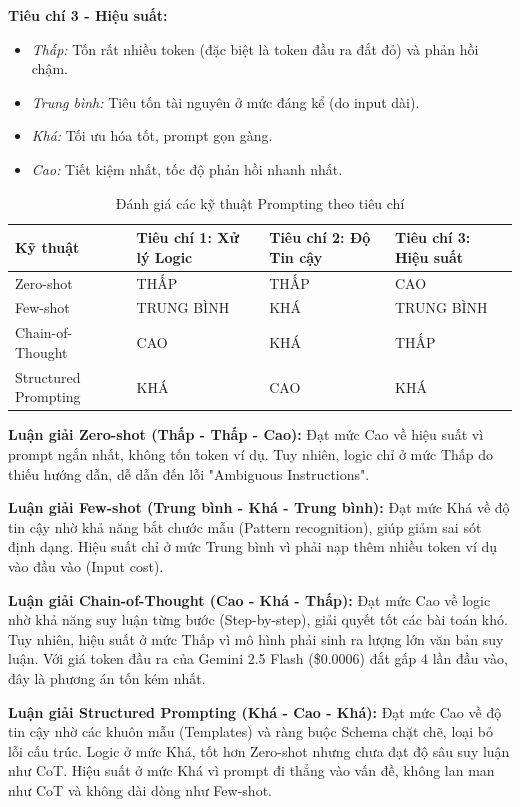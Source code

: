 \textbf{Tiêu chí 3 - Hiệu suất:}
\begin{itemize}
    \item \textit{Thấp:} Tốn rất nhiều token (đặc biệt là token đầu ra đắt đỏ) và phản hồi chậm.
    \item \textit{Trung bình:} Tiêu tốn tài nguyên ở mức đáng kể (do input dài).
    \item \textit{Khá:} Tối ưu hóa tốt, prompt gọn gàng.
    \item \textit{Cao:} Tiết kiệm nhất, tốc độ phản hồi nhanh nhất.
\end{itemize}

{\small
\begin{table}[htp]
\centering
\caption{Đánh giá các kỹ thuật Prompting theo tiêu chí}\label{tab:prompting-evaluation}
\begin{tabular}{|p{4cm}|p{3.2cm}|p{3.2cm}|p{3.2cm}|}
\hline
\textbf{Kỹ thuật} & \textbf{Tiêu chí 1: Xử lý Logic} & \textbf{Tiêu chí 2: Độ Tin cậy} & \textbf{Tiêu chí 3: Hiệu suất} \\ \hline
Zero-shot & THẤP & THẤP & CAO \\ \hline
Few-shot & TRUNG BÌNH & KHÁ & TRUNG BÌNH \\ \hline
Chain-of-Thought & CAO & KHÁ & THẤP \\ \hline
Structured Prompting & KHÁ & CAO & KHÁ \\ \hline
\end{tabular}
\end{table}
}

\textbf{Luận giải Zero-shot (Thấp - Thấp - Cao):} Đạt mức Cao về hiệu suất vì prompt ngắn nhất, không tốn token ví dụ. Tuy nhiên, logic chỉ ở mức Thấp do thiếu hướng dẫn, dễ dẫn đến lỗi "Ambiguous Instructions".

\textbf{Luận giải Few-shot (Trung bình - Khá - Trung bình):} Đạt mức Khá về độ tin cậy nhờ khả năng bắt chước mẫu (Pattern recognition), giúp giảm sai sót định dạng. Hiệu suất chỉ ở mức Trung bình vì phải nạp thêm nhiều token ví dụ vào đầu vào (Input cost).

\textbf{Luận giải Chain-of-Thought (Cao - Khá - Thấp):} Đạt mức Cao về logic nhờ khả năng suy luận từng bước (Step-by-step), giải quyết tốt các bài toán khó. Tuy nhiên, hiệu suất ở mức Thấp vì mô hình phải sinh ra lượng lớn văn bản suy luận. Với giá token đầu ra của Gemini 2.5 Flash (\$0.0006) đắt gấp 4 lần đầu vào, đây là phương án tốn kém nhất.

\textbf{Luận giải Structured Prompting (Khá - Cao - Khá):} Đạt mức Cao về độ tin cậy nhờ các khuôn mẫu (Templates) và ràng buộc Schema chặt chẽ, loại bỏ lỗi cấu trúc. Logic ở mức Khá, tốt hơn Zero-shot nhưng chưa đạt độ sâu suy luận như CoT. Hiệu suất ở mức Khá vì prompt đi thẳng vào vấn đề, không lan man như CoT và không dài dòng như Few-shot.

